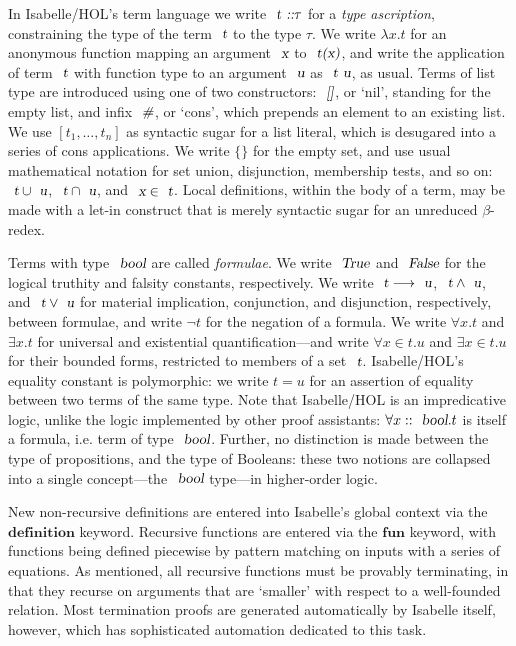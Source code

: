 \documentclass[acmlarge,review,anonymous]{acmart}\settopmatter{printfolios=true}
\begin{document}
In Isabelle/HOL's term language we write $\isa{t} \isa{::} \tau$ for a \emph{type ascription}, constraining the type of the term $\isa{t}$ to the type $\tau$.
We write $\lambda{x}. t$ for an anonymous function mapping an argument $\isa{x}$ to $\isa{t(x)}$, and write the application of term $\isa{t}$ with function type to an argument $\isa{u}$ as $\isa{t\ u}$, as usual.
Terms of list type are introduced using one of two constructors: $\isa{[]}$, or `nil', standing for the empty list, and infix $\isa{\#}$, or `cons', which prepends an element to an existing list.
We use $[t_1, \ldots, t_n]$ as syntactic sugar for a list literal, which is desugared into a series of cons applications.
We write $\{\}$ for the empty set, and use usual mathematical notation for set union, disjunction, membership tests, and so on: $\isa{t} \cup \isa{u}$, $\isa{t} \cap \isa{u}$, and $\isa{x} \in \isa{t}$.
Local definitions, within the body of a term, may be made with a let-in construct that is merely syntactic sugar for an unreduced $\beta$-redex.

Terms with type $\isa{bool}$ are called \emph{formulae}.
We write $\isa{True}$ and $\isa{False}$ for the logical truthity and falsity constants, respectively.
We write $\isa{t} \longrightarrow \isa{u}$, $\isa{t} \wedge \isa{u}$, and $\isa{t} \vee \isa{u}$ for material implication, conjunction, and disjunction, respectively, between formulae, and write $\neg t$ for the negation of a formula.
We write $\forall{x}.t$ and $\exists{x}.t$ for universal and existential quantification---and write $\forall{x{\in}t}.u$ and $\exists{x{\in}t}.u$ for their bounded forms, restricted to members of a set $\isa{t}$.
Isabelle/HOL's equality constant is polymorphic: we write $t = u$ for an assertion of equality between two terms of the same type.
Note that Isabelle/HOL is an impredicative logic, unlike the logic implemented by other proof assistants: $\forall{x::\isa{bool}}. t$ is itself a formula, i.e. term of type $\isa{bool}$.
Further, no distinction is made between the type of propositions, and the type of Booleans: these two notions are collapsed into a single concept---the $\isa{bool}$ type---in higher-order logic.

New non-recursive definitions are entered into Isabelle's global context via the $\mathbf{definition}$ keyword.
Recursive functions are entered via the $\mathbf{fun}$ keyword, with functions being defined piecewise by pattern matching on inputs with a series of equations.
As mentioned, all recursive functions must be provably terminating, in that they recurse on arguments that are `smaller' with respect to a well-founded relation.
Most termination proofs are generated automatically by Isabelle itself, however, which has sophisticated automation dedicated to this task.
\end{document}

